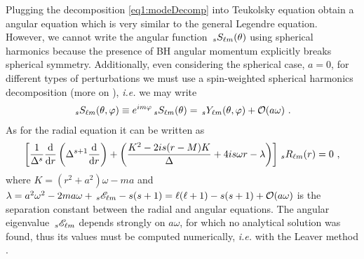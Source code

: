 Plugging the decomposition \eqref{eq1:modeDecomp} into Teukolsky equation \cite{Teukolsky1972} obtain a angular equation which is very similar to the general Legendre equation. However, we cannot write the angular function $\uu[s]{S}{\ell m}(\theta)$ using spherical harmonics because the presence of BH angular momentum explicitly breaks spherical symmetry. Additionally, even considering the spherical case, $a=0$, for different types of perturbations we must use a spin-weighted spherical harmonics decomposition (more on \cite{TorresdelCastillo2003}), \emph{i.e.} we may write
\begin{align}
    \uu[s]{S}{\ell m}(\theta, \varphi) \equiv e^{i m \varphi} \uu[s]{S}{\ell m}(\theta) = \uu[s]{Y}{\ell m}(\theta, \varphi) + \mathcal{O}(a \omega) ~.
\end{align}
As for the radial equation it can be written as
\begin{align}
    \left[ \frac{1}{\Delta^s} \frac{\dd}{\dd r} \left( \Delta^{s+1} \frac{\dd}{\dd r}  \right) + \left( \frac{K^2 - 2 i s(r-M) K}{\Delta} + 4 i s \omega r - \lambda \right) \right] \uu[s]{R}{\ell m}(r) = 0 ~,
\end{align}
where $K=(r^2+a^2)\omega - m a$ and $\lambda = a^2 \omega^2 - 2 m a \omega + \uu[s]{\mathscr{E}}{\ell m} - s(s+1) = \ell(\ell+1)-s(s+1)+\mathcal{O}(a \omega)$ is the separation constant between the radial and angular equations. The angular eigenvalue $\uu[s]{\mathscr{E}}{\ell m}$ depends strongly on $a \omega$, for which no analytical solution was found, thus its values must be computed numerically, \emph{i.e.} with the Leaver method \cite{Leaver1985,Leaver1986}.


\clearpage